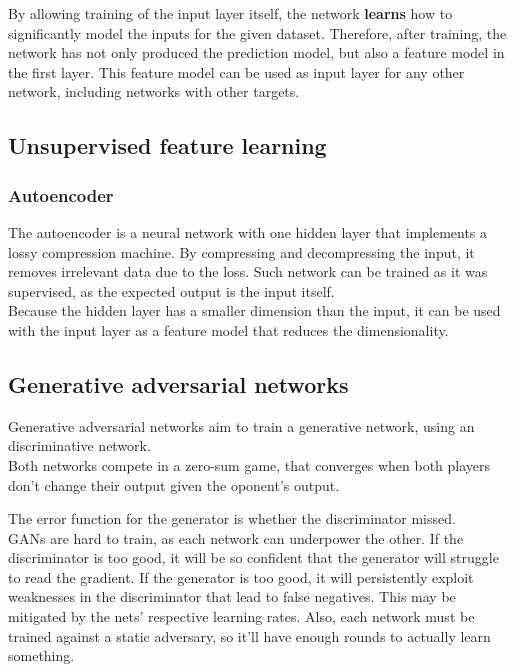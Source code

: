 \documentclass[11pt]{article}
\begin{document}
By allowing training of the input layer itself, the network \textbf{learns} how to
significantly model the inputs for the given dataset. Therefore, after training, the
network has not only produced the prediction model, but also a feature model in the
first layer. This feature model can be used as input layer for any other network,
including networks with other targets.
\subsection{Unsupervised feature learning}
\label{sec:orgb54e3a3}
\subsubsection{Autoencoder}
\label{sec:orga2cb5d5}
The autoencoder is a neural network with one hidden layer that implements a lossy
compression machine. By compressing and decompressing the input, it removes irrelevant
data due to the loss. Such network can be trained as it was supervised, as the
expected output is the input itself. \\

Because the hidden layer has a smaller dimension than the input, it can be used with
the input layer as a feature model that reduces the dimensionality.
\subsection{Generative adversarial networks}
\label{sec:org40e235c}
Generative adversarial networks aim to train a generative network, using an
discriminative network. \\
Both networks compete in a zero-sum game, that converges when both players don't
change their output given the oponent's output.
\begin{center}

\end{center}
The error function for the generator is whether the discriminator missed. \\

GANs are hard to train, as each network can underpower the other. If the discriminator
is too good, it will be so confident that the generator will struggle to read the
gradient. If the generator is too good, it will persistently exploit weaknesses in the
discriminator that lead to false negatives. This may be mitigated by the nets'
respective learning rates. Also, each network must be trained against a static
adversary, so it'll have enough rounds to actually learn something.
\end{document}
